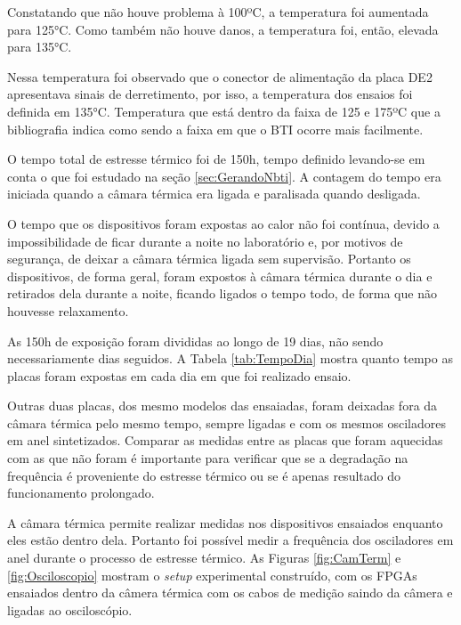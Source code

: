 Constatando que não houve problema à 100ºC, a temperatura foi aumentada para 125°C. Como também não houve danos, a temperatura foi, então, elevada para 135°C.

Nessa temperatura foi observado que o conector de alimentação da placa DE2 apresentava sinais de derretimento, por isso, a temperatura dos ensaios foi definida em 135°C. Temperatura que está dentro da faixa de 125 e 175ºC que a bibliografia indica como sendo a faixa em que o BTI ocorre mais facilmente.

O tempo total de estresse térmico foi de 150h, tempo definido levando-se em conta o que foi estudado na seção \ref{sec:GerandoNbti}. A contagem do tempo era iniciada quando a câmara térmica era ligada e paralisada quando desligada. 

O tempo que os dispositivos foram expostas ao calor não foi contínua, devido a impossibilidade de ficar durante a noite no laboratório e, por motivos de segurança, de deixar a câmara térmica ligada sem supervisão. Portanto os dispositivos, de forma geral, foram expostos à câmara térmica durante o dia e retirados dela durante a noite, ficando ligados o tempo todo, de forma que não houvesse relaxamento.

As 150h de exposição foram divididas ao longo de 19 dias, não sendo necessariamente dias seguidos. A Tabela \ref{tab:TempoDia} mostra quanto tempo as placas foram expostas em cada dia em que foi realizado ensaio.



Outras duas placas, dos mesmo modelos das ensaiadas, foram deixadas fora da câmara térmica pelo mesmo tempo, sempre ligadas e com os mesmos osciladores em anel sintetizados. Comparar as medidas entre as placas que foram aquecidas com as que não foram é importante para verificar que se a degradação na frequência é proveniente do estresse térmico ou se é apenas resultado do funcionamento prolongado.

A câmara térmica permite realizar medidas nos dispositivos ensaiados enquanto eles estão dentro dela. Portanto foi possível medir a frequência dos osciladores em anel durante o processo de estresse térmico. As Figuras \ref{fig:CamTerm} e \ref{fig:Osciloscopio} mostram o \textit{setup} experimental construído, com os FPGAs ensaiados dentro da câmera térmica com os cabos de medição saindo da câmera e ligadas ao osciloscópio.

